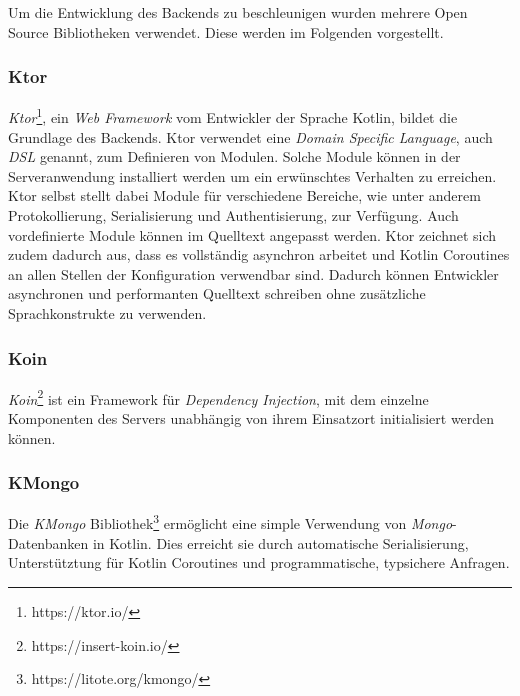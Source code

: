 \documentclass[a4paper, 11pt]{article}
\begin{document}
Um die Entwicklung des Backends zu beschleunigen wurden mehrere Open Source Bibliotheken verwendet.
Diese werden im Folgenden vorgestellt.

\subsubsection{Ktor}
\label{subsubsec:backend:bibs:ktor}

\textit{Ktor}\footnote{https://ktor.io/}, ein \textit{Web Framework} vom Entwickler der Sprache Kotlin, bildet die Grundlage des Backends.
Ktor verwendet eine \textit{Domain Specific Language}, auch \textit{DSL} genannt, zum Definieren von Modulen.
Solche Module können in der Serveranwendung installiert werden um ein erwünschtes Verhalten zu erreichen.
Ktor selbst stellt dabei Module für verschiedene Bereiche, wie unter anderem Protokollierung, Serialisierung und Authentisierung, zur Verfügung.
Auch vordefinierte Module können im Quelltext angepasst werden.
Ktor zeichnet sich zudem dadurch aus, dass es vollständig asynchron arbeitet und Kotlin Coroutines an allen Stellen der Konfiguration verwendbar sind.
Dadurch können Entwickler asynchronen und performanten Quelltext schreiben ohne zusätzliche Sprachkonstrukte zu verwenden.

\subsubsection{Koin}
\label{subsubsec:backend:bibs:koin}

\textit{Koin}\footnote{https://insert-koin.io/} ist ein Framework für \textit{Dependency Injection}, mit dem einzelne Komponenten des Servers unabhängig von ihrem Einsatzort initialisiert werden können.

\subsubsection{KMongo}
\label{subsubsec:backend:bibs:kmongo}

Die \textit{KMongo} Bibliothek\footnote{https://litote.org/kmongo/} ermöglicht eine simple Verwendung von \textit{Mongo}-Datenbanken in Kotlin.
Dies erreicht sie durch automatische Serialisierung, Unterstütztung für Kotlin Coroutines und programmatische, typsichere Anfragen.
\end{document}
